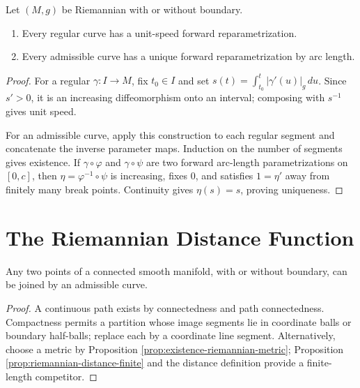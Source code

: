 \begin{proposition}
\label{prop:reparametrization-by-arc-length}
Let $(M,g)$ be Riemannian with or without boundary.
\begin{enumerate}
\item[(a)] Every regular curve has a unit-speed forward reparametrization.
\item[(b)] Every admissible curve has a unique forward reparametrization by arc length.
\end{enumerate}
\end{proposition}
\begin{proof}
\sketch For a regular $\gamma:I\to M$, fix $t_0\in I$ and set $s(t)=\int_{t_0}^t|\gamma'(u)|_g\,du$. Since $s'>0$, it is an increasing diffeomorphism onto an interval; composing with $s^{-1}$ gives unit speed.

For an admissible curve, apply this construction to each regular segment and concatenate the inverse parameter maps. Induction on the number of segments gives existence. If $\gamma\circ\varphi$ and $\gamma\circ\psi$ are two forward arc-length parametrizations on $[0,c]$, then $\eta=\varphi^{-1}\circ\psi$ is increasing, fixes $0$, and satisfies $1=\eta'$ away from finitely many break points. Continuity gives $\eta(s)=s$, proving uniqueness.
\end{proof}

\section{The Riemannian Distance Function}

\begin{proposition}
\label{prop:connected-manifold-admissible-curve}
\leanok
{}
Any two points of a connected smooth manifold, with or without boundary, can be joined by an admissible curve.
\end{proposition}
\begin{proof}
\leanok
{}
\sketch A continuous path exists by connectedness and path connectedness. Compactness permits a partition whose image segments lie in coordinate balls or boundary half-balls; replace each by a coordinate line segment. Alternatively, choose a metric by Proposition \ref{prop:existence-riemannian-metric}; Proposition \ref{prop:riemannian-distance-finite} and the distance definition provide a finite-length competitor.
\end{proof}

